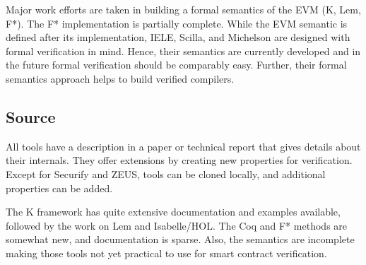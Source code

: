 Major work efforts are taken in building a formal semantics of the EVM (K, Lem, F*). 
The F* implementation is partially complete. While the EVM semantic is defined after its implementation, IELE, Scilla, and Michelson are designed with formal verification in mind. Hence, their semantics are currently developed and in the future formal verification should be comparably easy. Further, their formal semantics approach helps to build verified compilers.

\subsection{Source} 
All tools have a description in a paper or technical report that gives details about their internals. They offer extensions by creating new properties for verification. Except for Securify and ZEUS, tools can be cloned locally, and additional properties can be added.

The K framework has quite extensive documentation and examples available, followed by the work on Lem and Isabelle/HOL. The Coq and F* methods are somewhat new, and documentation is sparse. Also, the semantics are incomplete making those tools not yet practical to use for smart contract verification.
